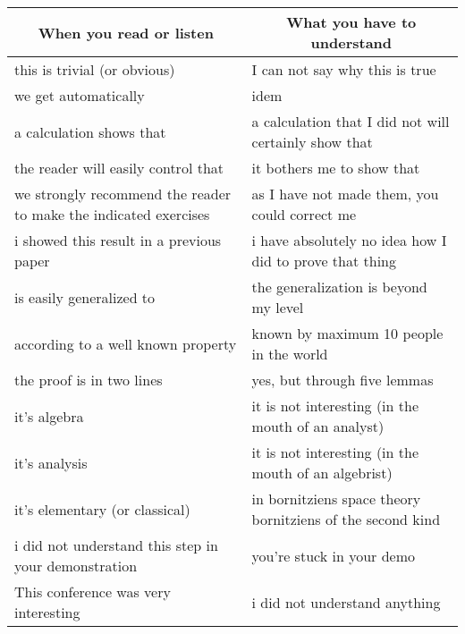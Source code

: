 	\begin{table}[H]
	\begin{center}
			\begin{tabular}{|p{7.5cm}|p{7.5cm}|}
				\hline
				\multicolumn{1}{c}{\cellcolor{black!30}\textbf{When you read or listen}} & 
  \multicolumn{1}{c}{\cellcolor{black!30}\textbf{What you have to understand}} \\ \hline
				this is trivial (or obvious) & I can not say why this is true \\ \hline
				we get automatically & idem \\ \hline
				a calculation shows that & a calculation that I did not will certainly show that\\ \hline
				the reader will easily control that & it bothers me to show that\\ \hline
				we strongly recommend the reader to make the indicated exercises & as I have not made them, you could correct me\\ \hline
				i showed this result in a previous paper & i have absolutely no idea how I did to prove that thing			
				\\ \hline
				is easily generalized to & the generalization is beyond my level			
				\\ \hline
				according to a well known property & known by maximum 10 people in the world
				\\ \hline
				the proof is in two lines & yes, but through five lemmas
				\\ \hline
				it's algebra & it is not interesting (in the mouth of an analyst)
				\\ \hline
				it's analysis & it is not interesting (in the mouth of an algebrist)
				\\ \hline
				it's elementary (or classical) & in bornitziens space theory bornitziens of the second kind
				\\ \hline
				i did not understand this step in your demonstration & you're stuck in your demo
				\\ \hline
				This conference was very interesting & i did not understand anything
				\\ \hline
		\end{tabular}
	\end{center}
	\end{table}	
	\begin{center}\underline{\hspace{5 cm}}\end{center}
	
